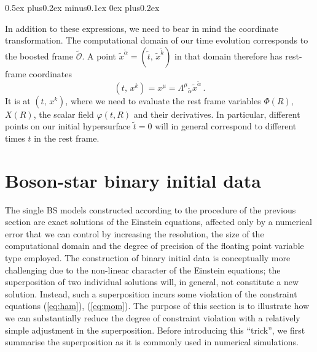 \documentclass[]{iopart}
\begin{document}
\begin{list}{\rm{\bf ()}}{
                
             \parsep0.5ex plus0.2ex minus0.1ex \itemsep0ex plus0.2ex}
  \item In addition to these expressions, we need to bear in mind the coordinate
  transformation. The computational domain of our time evolution corresponds
  to the boosted frame $\tilde{\mathcal{O}}$. A
  point $\tilde{x}^{\tilde{\alpha}}=(\tilde{t},\,\tilde{x}^{\tilde{k}})$
  in that domain therefore has rest-frame coordinates
  \begin{equation}
     (t,\,x^k) = x^{\mu} = \Lambda^{\mu}{}_{\tilde{\alpha}}\tilde{x}^{\tilde{\alpha}}\,.
  \end{equation}
  It is at $(t,\,x^k)$, where we need to evaluate the rest frame variables
  $\Phi(R)$, $X(R)$, the scalar field $\varphi(t,R)$ and their
  derivatives. In particular, different points on our initial
  hypersurface $\tilde{t}=0$ will in general correspond to different
  times $t$ in the rest frame.
\end{list}
%

\section{Boson-star binary initial data}
\label{sec:superposition}
%
The single BS models constructed according to the procedure of the
previous section are exact solutions of the Einstein equations, affected
only by a numerical error that we can control by increasing the resolution,
the size of the computational domain and the degree of precision of the floating
point variable type employed. The construction of binary initial data is
conceptually more challenging due to the non-linear character of the
Einstein equations; the superposition of two individual solutions will,
in general, not constitute a new solution. Instead, such a superposition
incurs some violation of the constraint equations (\ref{eq:ham}),
(\ref{eq:mom}). The purpose of this section is to illustrate
how we can substantially reduce the degree of constraint
violation with a relatively simple adjustment in the
superposition. Before introducing this ``trick'', we first
summarise the superposition as it is commonly used in numerical
simulations.

\end{document}

